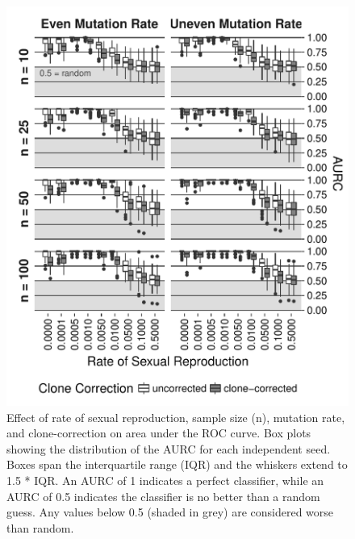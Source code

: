 \documentclass[]{article}
\theoremstyle{definition}
\theoremstyle{definition}
\theoremstyle{definition}
\theoremstyle{remark}
\begin{document}
\begin{figure}
\centering
\includegraphics[width=1.00000\textwidth]{figure/AURC_box_plot.pdf}
\caption{Effect of rate of sexual reproduction, sample size (n),
mutation rate, and clone-correction on area under the ROC curve. Box
plots showing the distribution of the AURC for each independent seed.
Boxes span the interquartile range (IQR) and the whiskers extend to 1.5
* IQR. An AURC of 1 indicates a perfect classifier, while an AURC of 0.5
indicates the classifier is no better than a random guess. Any values
below 0.5 (shaded in grey) are considered worse than
random.}\label{fig:sim2}
\end{figure}
\end{document}
